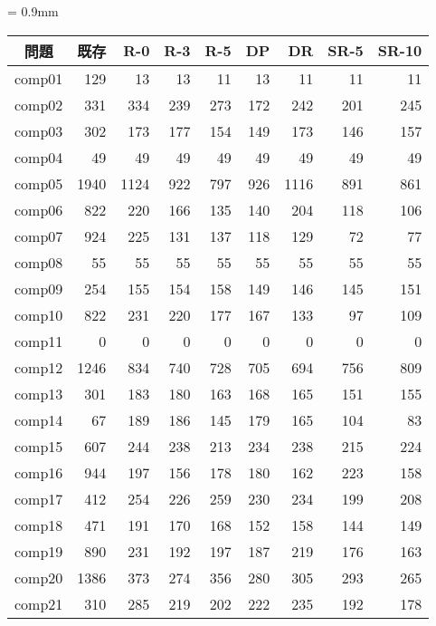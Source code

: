 \documentclass[a4j,10pt]{jarticle}
\begin{document}
\begin{multicols}{1}
\begin{minipage}{1\linewidth}
 \centering
{}
 \renewcommand{\arraystretch}{0.7}
 \tabcolsep = 0.9mm
 \begin{tabular}{c||r|r|r|r|r|r|r|r}
問題 & 既存 & R-0 & R-3 & R-5 & DP & DR & SR-5 & SR-10\\\hline
comp01 & 129 & 13 & 13 & 11 & 13 & 11 & 11 & 11\\
comp02 & 331 & 334 & 239 & 273 &172 & 242 & 201 & 245\\
comp03 & 302 & 173 & 177 & 154 & 149 & 173 & 146 & 157\\
comp04 & 49 & 49 & 49 & 49 & 49 & 49 & 49 & 49\\
comp05 & 1940 & 1124 & 922 & 797 & 926 & 1116 & 891 & 861\\
comp06 & 822 & 220 & 166 & 135 & 140 & 204 & 118 & 106\\
comp07 & 924 & 225 & 131 & 137 & 118 & 129 & 72 & 77\\
comp08 & 55 & 55 & 55 & 55 & 55 & 55 & 55 & 55\\
comp09 & 254 & 155 & 154 & 158 & 149 & 146 & 145 & 151\\
comp10 & 822 & 231 & 220 & 177 & 167 & 133 & 97 & 109\\
comp11 & 0 & 0 & 0 & 0 & 0 & 0 & 0 & 0\\
comp12 & 1246 & 834 & 740 & 728 & 705 & 694 & 756 & 809\\
comp13 & 301 & 183 & 180 & 163 & 168 & 165 & 151 & 155\\
comp14 & 67 & 189 & 186 & 145 & 179 & 165 & 104 & 83\\
comp15 & 607 & 244 & 238 & 213 & 234 & 238 & 215 & 224\\
comp16 & 944 & 197 & 156 & 178 & 180 & 162 & 223 & 158\\
comp17 & 412 & 254 & 226 & 259 & 230 & 234 & 199 & 208\\
comp18 & 471 & 191 & 170 & 168 & 152 & 158 & 144 & 149\\
comp19 & 890 & 231 & 192 & 197 & 187 & 219 & 176 & 163\\
comp20 & 1386 & 373 & 274 & 356 & 280 & 305 & 293 & 265\\
comp21 & 310 & 285 & 219 & 202 & 222 & 235 & 192 & 178\\\hline
 \end{tabular}
 \label{tab:result}
\end{minipage}


\end{multicols}
\end{document}
